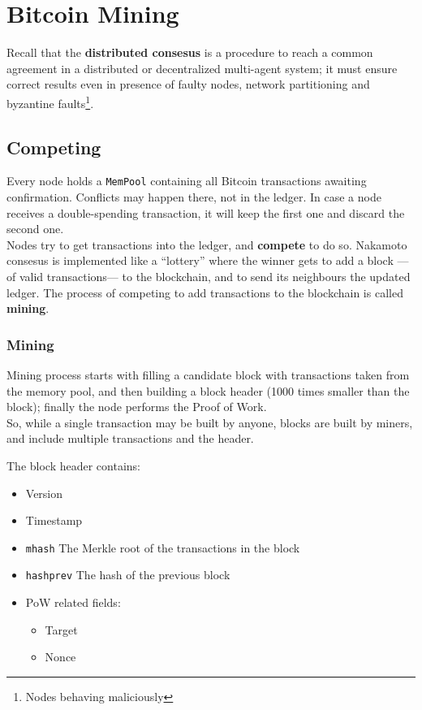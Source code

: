 \chapter{Bitcoin Mining}

Recall that the \textbf{distributed consesus} is a procedure to reach a common agreement in a distributed or decentralized multi-agent system;
it must ensure correct results even in presence of faulty nodes, network partitioning and byzantine faults\footnote{Nodes behaving maliciously}.


\section{Competing}
Every node holds a \texttt{MemPool} containing all Bitcoin transactions awaiting confirmation.
Conflicts may happen there, not in the ledger.
In case a node receives a double-spending transaction, it will keep the first one and discard the second one.\\
Nodes try to get transactions into the ledger, and \textbf{compete} to do so.
Nakamoto consesus is implemented like a ``lottery'' where the winner gets to add a block ---of valid transactions--- to the blockchain, and to send its neighbours the updated ledger. The process of competing to add transactions to the blockchain is called \textbf{mining}.

\subsection{Mining}
Mining process starts with filling a candidate block with transactions taken
from the memory pool, and then building a block header (1000 times smaller than the block);
finally the node performs the Proof of Work.\\
So, while a single transaction may be built by anyone, blocks are built by miners, and include multiple transactions and the header.

The block header contains:
\begin{itemize}
   \item Version
   \item Timestamp
   \item \texttt{mhash} The Merkle root of the transactions in the block
   \item \texttt{hashprev} The hash of the previous block
   \item PoW related fields:
   \begin{itemize}
      \item Target
      \item Nonce
   \end{itemize}
\end{itemize}

